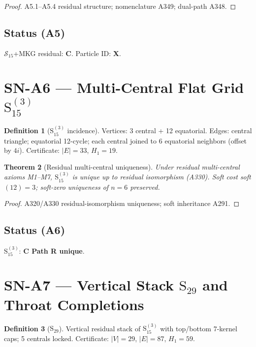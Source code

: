 \documentclass[11pt,a4paper]{article}
\newtheorem{theorem}{Theorem}[section]
\theoremstyle{definition}
\newtheorem{definition}[theorem]{Definition}
\begin{document}
\begin{proof}
A5.1--A5.4 residual structure; nomenclature A349; dual-path A348.
\end{proof}

\subsection*{Status (A5)} $\mathcal{S}_{15}$+MKG residual: \textbf{C}. Particle ID: \textbf{X}.

\section{SN-A6 --- Multi-Central Flat Grid $\mathrm{S}_{15}^{(3)}$}
\label{sec:SNA6}

\begin{definition}[$\mathrm{S}_{15}^{(3)}$ incidence]
\label{def:A6}
Vertices: 3 central + 12 equatorial. Edges: central triangle; equatorial 12-cycle;
each central joined to 6 equatorial neighbors (offset by $4i$). Certificate: $|E|=33$, $H_1=19$.
\end{definition}

\begin{theorem}[Residual multi-central uniqueness]
\label{thm:A6}
Under residual multi-central axioms M1--M7, $\mathrm{S}_{15}^{(3)}$ is unique up to residual isomorphism
(A330). Soft cost soft$(12)=3$; soft-zero uniqueness of $n=6$ preserved.
\end{theorem}

\begin{proof}
A320/A330 residual-isomorphism uniqueness; soft inheritance A291.
\end{proof}

\subsection*{Status (A6)} $\mathrm{S}_{15}^{(3)}$: \textbf{C Path R unique}.

\section{SN-A7 --- Vertical Stack $\mathrm{S}_{29}$ and Throat Completions}
\label{sec:SNA7}

\begin{definition}[$\mathrm{S}_{29}$]
\label{def:A7}
Vertical residual stack of $\mathrm{S}_{15}^{(3)}$ with top/bottom 7-kernel caps; 5 centrals locked.
Certificate: $|V|=29$, $|E|=87$, $H_1=59$.
\end{definition}
\end{document}
